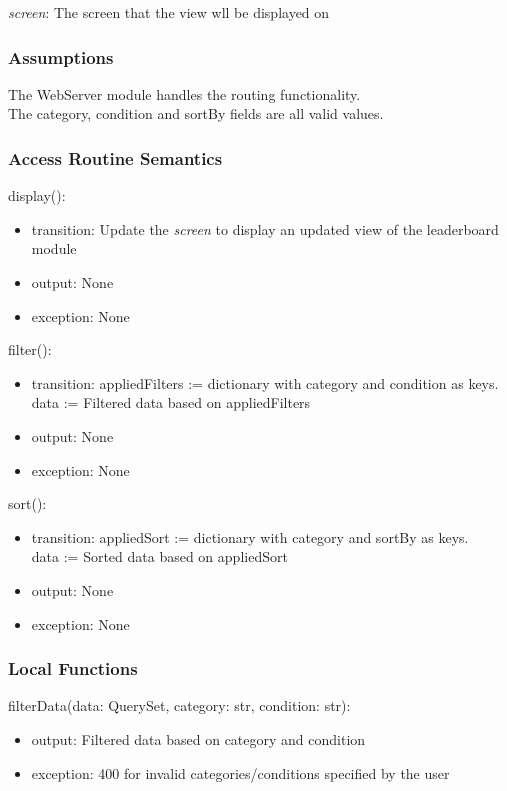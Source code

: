 \documentclass[12pt, titlepage]{article}
\begin{document}
\textit{screen}: The screen that the view wll be displayed on

\subsubsection{Assumptions}

The WebServer module handles the routing functionality. \\
The category, condition and sortBy fields are all valid values.

\subsubsection{Access Routine Semantics}

\noindent display():
\begin{itemize}
\item transition: Update the \textit{screen} to display an updated view of the leaderboard module
\item output: None
\item exception: None
\end{itemize}

\noindent filter():
\begin{itemize}
\item transition: appliedFilters := dictionary with category and condition as keys. \\
data := Filtered data based on appliedFilters
\item output: None
\item exception: None
\end{itemize}

\noindent sort():
\begin{itemize}
\item transition: appliedSort := dictionary with category and sortBy as keys. \\
data := Sorted data based on appliedSort
\item output: None
\item exception: None
\end{itemize}

\subsubsection{Local Functions}

\noindent filterData(data: QuerySet, category: str, condition: str):
\begin{itemize}
\item output: Filtered data based on category and condition
\item exception: 400 for invalid categories/conditions specified by the user
\end{itemize}
\end{document}
